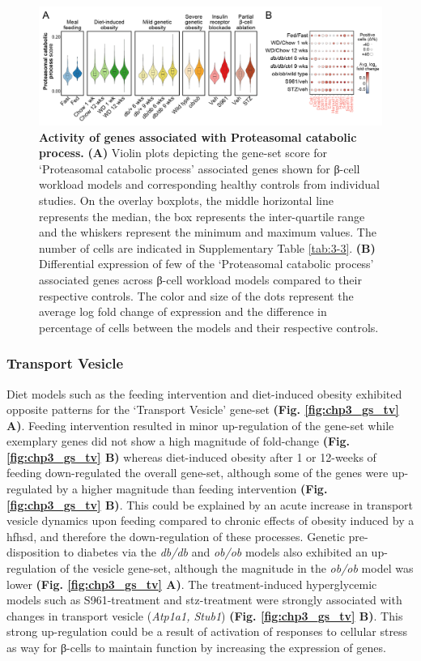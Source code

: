 \begin{figure}[H]
\centering
\includegraphics[width=\linewidth]{Chapter5/Fig/F3-13-04.png}
\caption[Scoring of gene-set - \textit{Proteasomal Catabolic process}]{\textbf{Activity of genes associated with Proteasomal catabolic process.} \textbf{(A)} Violin plots depicting the gene-set score for `Proteasomal catabolic process' associated genes shown for β-cell workload models and corresponding healthy controls from individual studies. On the overlay boxplots, the middle horizontal line represents the median, the box represents the inter-quartile range and the whiskers represent the minimum and maximum values. The number of cells are indicated in Supplementary Table \ref{tab:3-3}. \textbf{(B)} Differential expression of few of the `Proteasomal catabolic process' associated genes across β-cell workload models compared to their respective controls. The color and size of the dots represent the average log fold change of expression and the difference in percentage of cells between the models and their respective controls.}
\label{fig:chp3_gs_pcp}
\end{figure}


\subsubsection{Transport Vesicle}
Diet models such as the feeding intervention and diet-induced obesity exhibited opposite patterns for the ‘Transport Vesicle’ gene-set \textbf{(Fig. \ref{fig:chp3_gs_tv} A)}.  Feeding intervention resulted in minor up-regulation of the gene-set while exemplary genes did not show a high magnitude of fold-change \textbf{(Fig. \ref{fig:chp3_gs_tv} B)} whereas diet-induced obesity after 1 or 12-weeks of feeding down-regulated the overall gene-set, although some of the genes were up-regulated by a higher magnitude than feeding intervention \textbf{(Fig. \ref{fig:chp3_gs_tv} B)}. This could be explained by an acute increase in transport vesicle dynamics upon feeding compared to chronic effects of obesity induced by a \gls{hfhsd}, and therefore the down-regulation of these processes. Genetic pre-disposition to diabetes via the \textit{db/db} and \textit{ob/ob} models also exhibited an up-regulation of the vesicle gene-set, although the magnitude in the  \textit{ob/ob} model was lower \textbf{(Fig. \ref{fig:chp3_gs_tv} A)}. The treatment-induced hyperglycemic models such as S961-treatment and \gls{stz}-treatment were strongly associated with changes in transport vesicle (\textit{Atp1a1, Stub1}) \textbf{(Fig. \ref{fig:chp3_gs_tv} B)}. This strong up-regulation could be a result of activation of responses to cellular stress as way for β-cells to maintain function by increasing the expression of genes.\\

